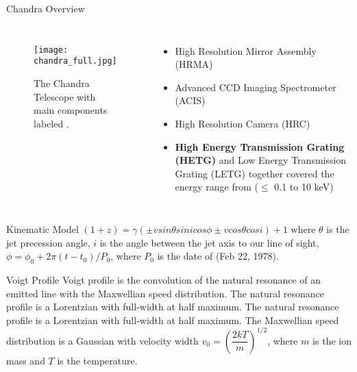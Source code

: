\documentclass{beamer}
\begin{document}


\begin{frame}{Chandra Overview}
       \begin{columns}
            \begin{figure}
                \centering
                \texttt{[image: chandra\_full.jpg]}
                \caption{The Chandra Telescope with main components labeled \citep{Harbaugh2017}.}
                \label{Chandratelescope}               \end{figure}
          \begin{itemize}
              \item High Resolution Mirror Assembly (HRMA)
              \item Advanced CCD Imaging Spectrometer (ACIS)
              \item High Resolution Camera (HRC)
              \item \textbf{High Energy Transmission Grating (HETG)} and Low Energy Transmission Grating (LETG) together covered the energy range from ($\leq$ 0.1 to 10 keV)
          \end{itemize}
          \end{columns} 
\end{frame}


\begin{frame}{Kinematic Model}
$(1+z) = \gamma (\pm vsin\theta sin i cos\phi \pm vcos\theta cos i) +1$
where $\theta$ is the jet precession angle, $i$ is the angle between the jet axis to our line of sight, $\phi = \phi_0 + 2\pi (t-t_0)/P_0$, where $P_0$ is the date of (Feb 22, 1978).
    
\end{frame}



\begin{frame}{Voigt Profile}
Voigt profile is the convolution
of the natural resonance of an emitted line with the Maxwellian speed distribution. The natural resonance profile is a Lorentzian with full-width at half
maximum. The natural resonance profile is a Lorentzian with full-width at half
maximum. The Maxwellian speed distribution is a Gaussian with velocity width $v_0 = (\dfrac{2kT}{m})^{1/2}$, where $m$ is the ion mass and $T$ is the temperature.
    
\end{frame}
\end{document}
